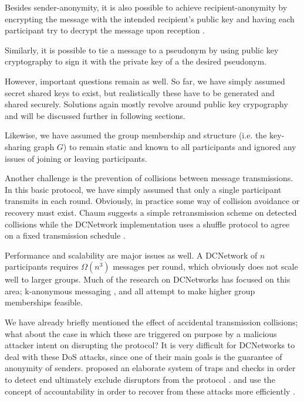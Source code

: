 Besides sender-anonymity, it is also possible to achieve recipient-anonymity by
encrypting the message with the intended recipient's public key and having each
participant try to decrypt the message upon reception \cite{journals/joc/Chaum88}.

Similarly, it is possible to tie a message to a pseudonym by using public key cryptography
to sign it with the private key of a the desired pseudonym.

However, important questions remain as well. So far, we have simply assumed secret shared keys
to exist, but realistically these have to be generated and shared securely. Solutions
again mostly revolve around public key crypography and will be discussed further in
following sections.

Likewise, we have assumed the group membership and structure (i.e. the key-sharing graph $G$)
to remain static and known to all participants and ignored any issues of joining or leaving participants.

Another challenge is the prevention of collisions between message transmissions.
In this basic protocol, we have simply assumed that only a single participant transmits
in each round. Obviously, in practice some way of collision avoidance or recovery must exist.
Chaum suggests a simple retransmission scheme on detected collisions \cite{journals/joc/Chaum88}
while the \ac{DCNetwork} implementation \Dissent uses a shuffle protocol to agree on
a fixed transmission schedule \cite{journals/corr/abs-1004-3057}.

Performance and scalability are major issues as well. A \ac{DCNetwork} of $n$ participants requires $\Omega(n^3)$ messages per round, which obviously does not scale well to larger groups.
Much of the research on \acp{DCNetwork} has focused on this area; k-anonymous messaging \cite{von2003k},
\Dissent \cite{journals/corr/abs-1004-3057} and \Verdict \cite{corrigan2013proactively}
all attempt to make higher group memberships feasible.

We have already briefly mentioned the effect of accidental transmission collisions; what about the
case in which these are triggered on purpose by a malicious attacker intent on disrupting the
protocol? It is very difficult for \acp{DCNetwork} to deal with these \ac{DoS} attacks,
since one of their main goals is the guarantee of anonymity of senders. \citeauthor{journals/joc/Chaum88}
proposed an elaborate system of traps and checks in order to detect end ultimately exclude
disruptors from the protocol \cite{journals/joc/Chaum88}. \Dissent and \Verdict use the concept of
accountability in order to recover from these attacks more efficiently \cite{journals/corr/abs-1004-3057,corrigan2013proactively}.


